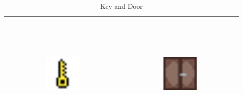 \begin{table}[h!]
    \begin{center}
    \begin{tabular}{ | c | c | }
    \hline
    \includegraphics[width=0.3\textwidth, height=60mm]{images/key.png}
    & 
    \includegraphics[width=0.3\textwidth, height=60mm]{images/Door.png}    
    \\
    \hline
    \end{tabular}
    \caption{Key and Door}
    \label{tbl:Key and Door}
    \end{center}
\end{table}

